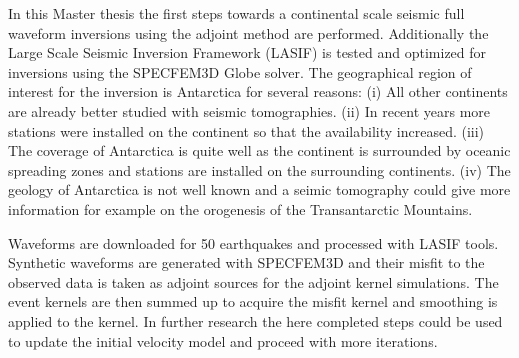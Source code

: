 
In this Master thesis the first steps towards a continental scale seismic full waveform inversions 
using the adjoint method are performed. Additionally the Large Scale Seismic Inversion Framework 
(LASIF) is tested and optimized for inversions using the SPECFEM3D Globe solver.
The geographical region of interest for the inversion is Antarctica for several reasons:
(i) All other continents are already better studied with seismic tomographies.
(ii) In recent years more stations were installed on the continent so that the availability increased.
(iii) The coverage of Antarctica is quite well as the continent is surrounded by oceanic spreading zones 
and stations are installed on the surrounding continents.
(iv) The geology of Antarctica is not well known and a seimic tomography could give more information
for example on the orogenesis of the Transantarctic Mountains.

Waveforms are downloaded for 50 earthquakes and processed with LASIF tools. 
Synthetic waveforms are generated with SPECFEM3D and their misfit to the observed data is taken as
adjoint sources for the adjoint kernel simulations. 
The event kernels are then summed up to acquire the misfit kernel and smoothing is applied to the kernel.
In further research the here completed steps could be used to update the initial velocity model and 
proceed with more iterations.

 




